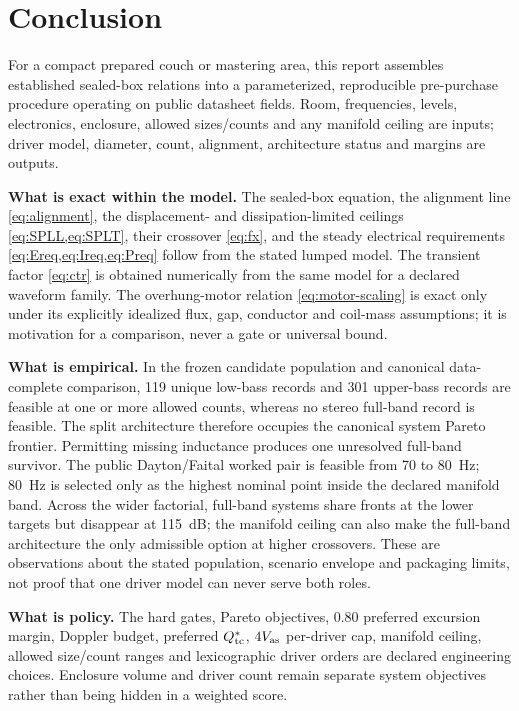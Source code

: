 \section{Conclusion}
\label{sec:conclusion}

For a compact prepared couch or mastering area, this report assembles
established sealed-box relations into a parameterized, reproducible
pre-purchase procedure operating on public datasheet fields. Room,
frequencies, levels, electronics, enclosure, allowed sizes/counts and any
manifold ceiling are inputs; driver model, diameter, count, alignment,
architecture status and margins are outputs.

\textbf{What is exact within the model.} The sealed-box equation, the
alignment line \cref{eq:alignment}, the displacement- and
dissipation-limited ceilings \cref{eq:SPLL,eq:SPLT}, their crossover
\cref{eq:fx}, and the steady electrical requirements
\cref{eq:Ereq,eq:Ireq,eq:Preq} follow from the stated lumped model. The
transient factor \cref{eq:ctr} is obtained numerically from the same model
for a declared waveform family. The overhung-motor relation
\cref{eq:motor-scaling} is exact only under its explicitly idealized flux,
gap, conductor and coil-mass assumptions; it is motivation for a
comparison, never a gate or universal bound.

\textbf{What is empirical.} In the frozen candidate population and
canonical data-complete comparison, 119 unique low-bass records and 301
upper-bass records are feasible at one or more allowed counts, whereas no
stereo full-band record is feasible. The split architecture therefore
occupies the canonical system Pareto frontier. Permitting missing
inductance produces one unresolved full-band survivor. The public
Dayton/Faital worked pair is feasible from 70 to \SI{80}{\hertz};
\SI{80}{\hertz} is selected only as the highest nominal point inside the
declared manifold band. Across the wider factorial, full-band systems share
fronts at the lower targets but disappear at \SI{115}{dB}; the manifold
ceiling can also make the full-band architecture the only admissible option
at higher crossovers. These are observations about the stated population,
scenario envelope and packaging limits, not proof that one driver model can
never serve both roles.

\textbf{What is policy.} The hard gates, Pareto objectives, 0.80 preferred
excursion margin, Doppler budget, preferred $Q_{\mathrm{tc}}^\ast$, $4V_{\mathrm{as}}$
per-driver cap, manifold ceiling, allowed size/count ranges and
lexicographic driver orders are declared engineering choices. Enclosure
volume and driver count remain separate system objectives rather than
being hidden in a weighted score.

